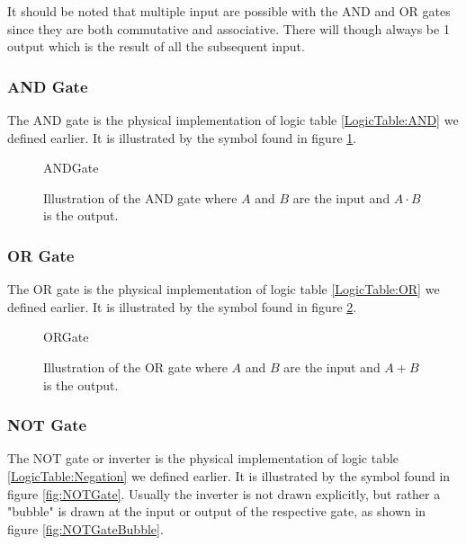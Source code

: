             It should be noted that multiple input are possible with the AND and OR gates since they are both commutative and associative. There will though always be 1 output which is the result of all the subsequent input.
            
            \subsubsection{AND Gate}
                The AND gate is the physical implementation of logic table \ref{LogicTable:AND} we defined earlier. It is illustrated by the symbol found in figure \ref{fig:ANDGate}. 
                
                \begin{figure}[h!]
                    \centering
                    {ANDGate}
                    \caption{Illustration of the AND gate where $A$ and $B$ are the input and $A\cdot B$ is the output.}
                    \label{fig:ANDGate}
                \end{figure}
            
            \subsubsection{OR Gate}
                The OR gate is the physical implementation of logic table \ref{LogicTable:OR} we defined earlier. It is illustrated by the symbol found in figure \ref{fig:ORGate}. 
                
                \begin{figure}[h!]
                    \centering
                    {ORGate}
                    \caption{Illustration of the OR gate where $A$ and $B$ are the input and $A+B$ is the output.}
                    \label{fig:ORGate}
                \end{figure} 
            
            \subsubsection{NOT Gate}
                The NOT gate or inverter is the physical implementation of logic table \ref{LogicTable:Negation} we defined earlier. It is illustrated by the symbol found in figure \ref{fig:NOTGate}. Usually the inverter is not drawn explicitly, but rather a "bubble" is drawn at the input or output of the respective gate, as shown in figure \ref{fig:NOTGateBubble}. 
                
